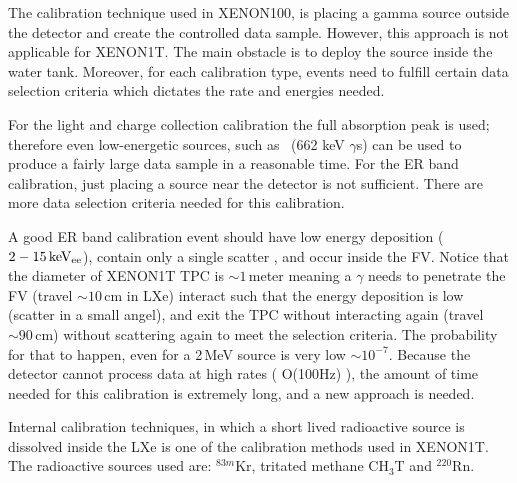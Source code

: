 The calibration technique used in XENON100, is placing a gamma source outside the detector and create the controlled data sample. However, this approach is not applicable for XENON1T. The main obstacle is to deploy the source inside the water tank. Moreover, for each calibration type, events need to fulfill certain data selection criteria which dictates the rate and energies needed. 

For the light and charge collection calibration the full absorption peak is used; therefore even low-energetic sources, such as \Cs\ (662 keV $\gamma$s) can be used to produce a fairly large data sample in a reasonable time. For the ER band calibration, just placing a source near the detector is not sufficient. There are more  data selection criteria needed for this calibration. 

A good ER band calibration event should have low energy deposition ($2-15\,\mathrm{keV_\mathrm{ee}}$), contain only a single scatter , and occur inside the FV. Notice that the diameter of XENON1T TPC is $\sim 1$\,meter meaning a $\gamma$ needs to penetrate the FV (travel $\sim 10$\,cm in LXe) interact such that the energy deposition is low (scatter in a small angel), and exit the TPC without interacting again (travel $\sim 90$\,cm) without scattering again to meet the selection criteria. The probability for that to happen, even for a 2\,MeV source is very low $\sim 10^{-7}$. Because the detector cannot process data at high rates ( O(100Hz) ), the amount of time needed for this calibration is extremely long, and a new approach is needed.

Internal calibration techniques, in which a short lived radioactive source is dissolved inside the LXe is one of the calibration methods used in XENON1T. The radioactive sources used are: $^{83m}\mathrm{Kr}$, tritated methane $\mathrm{CH_3T}$ and $^{220}\mathrm{Rn}$.    





